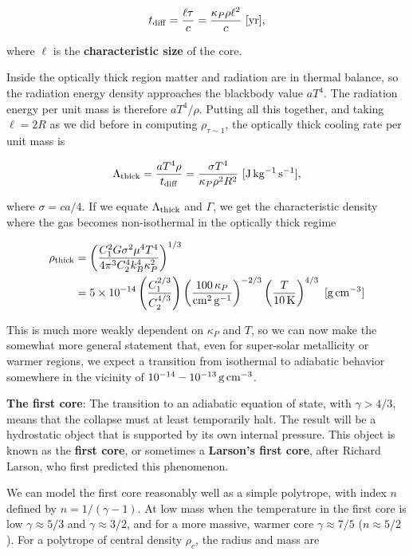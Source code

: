 \documentclass[a4paper,10pt]{article}
\begin{document}
\begin{align*}
    t_{\rm diff} = \frac{\ell\tau}{c} = \frac{\kappa_P\rho\ell^2}{c} ~ [{\rm yr}],
\end{align*}

{\noindent}where $\ell$ is the \textbf{characteristic size} of the core.

{\noindent}Inside the optically thick region matter and radiation are in thermal balance, so the radiation energy density approaches the blackbody value $aT^4$. The radiation energy per unit mass is therefore $aT^4/\rho$. Putting all this together, and taking $\ell=2R$ as we did before in computing $\rho_{\tau\sim1}$, the optically thick cooling rate per unit mass is

\begin{align*}
    \Lambda_{\rm thick} = \frac{aT^4\rho}{t_{\rm diff}} = \frac{\sigma T^4}{\kappa_P\rho^2R^2} ~ [{\rm J\,kg^{-1}\,s^{-1}}],
\end{align*}

{\noindent}where $\sigma=ca/4$. If we equate $\Lambda_{\rm thick}$ and $\Gamma$, we get the characteristic density where the gas becomes non-isothermal in the optically thick regime

\begin{align*}
    \rho_{\rm thick} &= \left(\frac{C_1^2G\sigma^2\mu^4T^4}{4\pi^3C_2^4k_B^4\kappa_P^2}\right)^{1/3} \\
    &= 5\times10^{-14} \left(\frac{C_1^{2/3}}{C_2^{4/3}}\right) \left(\frac{100\,\kappa_P}{{\rm cm^2\,g^{-1}}}\right)^{-2/3} \left(\frac{T}{10\,{\rm K}}\right)^{4/3} ~ [{\rm g\,cm^{-3}}]
\end{align*}

{\noindent}This is much more weakly dependent on $\kappa_P$ and $T$, so we can now make the somewhat more general statement that, even for super-solar metallicity or warmer regions, we expect a transition from isothermal to adiabatic behavior somewhere in the vicinity of $10^{-14}-10^{-13}\,{\rm g\,cm^{-3}}$.

{\noindent}\textbf{The first core}: The transition to an adiabatic equation of state, with $\gamma>4/3$, means that the collapse must at least temporarily halt. The result will be a hydrostatic object that is supported by its own internal pressure. This object is known as the \textbf{first core}, or sometimes a \textbf{Larson's first core}, after Richard Larson, who first predicted this phenomenon.

{\noindent}We can model the first core reasonably well as a simple polytrope, with index $n$ defined by $n=1/(\gamma-1)$. At low mass when the temperature in the first core is low $\gamma\approx5/3$ and $\gamma\approx3/2$, and for a more massive, warmer core $\gamma\approx7/5$ ($n\approx5/2$). For a polytrope of central density $\rho_c$, the radius and mass are
\end{document}

